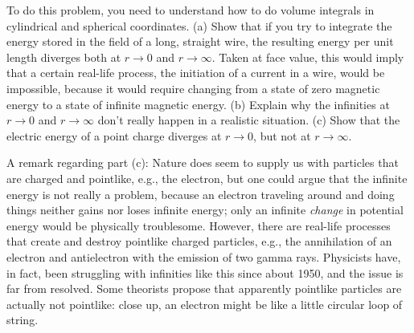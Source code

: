 To do this problem, you need to understand how to do
volume integrals in cylindrical and spherical coordinates.
(a) Show that if you try to integrate the energy stored in
the field of a long, straight wire, the resulting energy per
unit length diverges both at $r\rightarrow 0$ and $r\rightarrow \infty$.
Taken at face value, this would imply that a certain
real-life process, the initiation of a current in a wire,
would be impossible, because it would require changing from
a state of zero magnetic energy to a state of infinite
magnetic energy. (b) Explain why the infinities at
$r\rightarrow 0$ and $r\rightarrow \infty$ don't really happen
in a realistic situation. (c) Show that the electric energy
of a point charge diverges at $r\rightarrow 0$, but not at
$r\rightarrow \infty$.

A remark regarding part (c): Nature does seem to supply us
with particles that are charged and pointlike, e.g., the
electron, but one could argue that the infinite energy is
not really a problem, because an electron traveling around
and doing things neither gains nor loses infinite energy;
only an infinite \emph{change} in potential energy would be
physically troublesome. However, there are real-life
processes that create and destroy pointlike charged
particles, e.g., the annihilation of an electron and
antielectron with the emission of two gamma rays. Physicists
have, in fact, been struggling with infinities like this
since about 1950, and the issue is far from resolved. Some
theorists propose that apparently pointlike particles are
actually not pointlike: close up, an electron might be like
a little circular loop of string.
